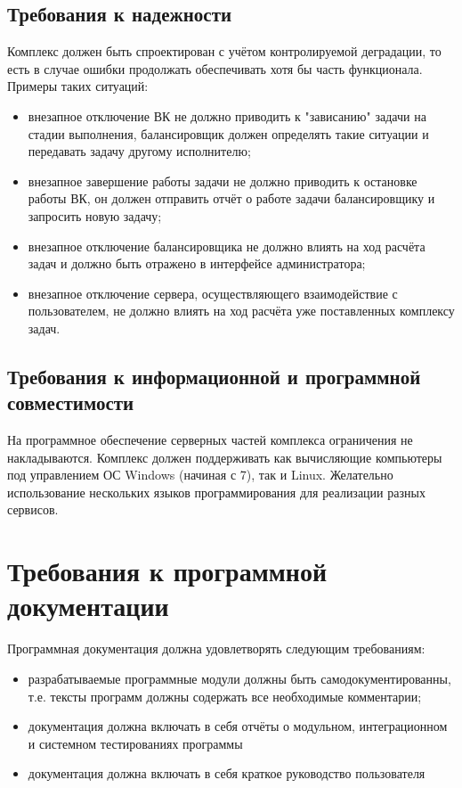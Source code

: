 \documentclass[a4paper,12pt]{report}
\numberwithin{equation}{section}
\begin{document}
\subsection{Требования к надежности}
Комплекс должен быть спроектирован с учётом контролируемой деградации, то есть в случае ошибки продолжать обеспечивать хотя бы часть функционала. Примеры таких ситуаций:
\begin{itemize}
  \item внезапное отключение ВК не должно приводить к "зависанию" задачи на стадии выполнения, балансировщик должен определять такие ситуации и передавать задачу другому исполнителю;
  \item внезапное завершение работы задачи не должно приводить к остановке работы ВК, он должен отправить отчёт о работе задачи балансировщику и запросить новую задачу;
  \item внезапное отключение балансировщика не должно влиять на ход расчёта задач и должно быть отражено в интерфейсе администратора;
  \item внезапное отключение сервера, осуществляющего взаимодействие с пользователем, не должно влиять на ход расчёта уже поставленных комплексу задач.
\end{itemize}

\subsection{Требования к информационной и программной совместимости}
На программное обеспечение серверных частей комплекса ограничения не накладываются.
Комплекс должен поддерживать как вычисляющие компьютеры под управлением ОС Windows (начиная с 7), так и Linux.
Желательно использование нескольких языков программирования для реализации разных сервисов.

\section{Требования к программной документации}
Программная документация должна удовлетворять следующим требованиям:
\begin{itemize}
  \item разрабатываемые программные модули должны быть самодокументированны, т.е. тексты программ должны содержать все необходимые комментарии;
  \item документация должна включать в себя отчёты о модульном, интеграционном и системном тестированиях программы
  \item документация должна включать в себя краткое руководство пользователя
\end{itemize}
\end{document}
